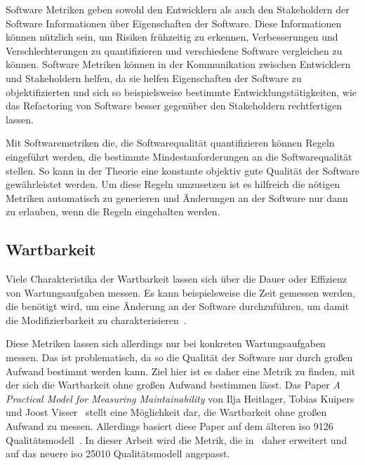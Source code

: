 \documentclass[12pt, a4paper, ngerman]{article}
\begin{document}
Software Metriken geben sowohl den Entwicklern
als auch den Stakeholdern der Software
Informationen über Eigenschaften der Software.
Diese Informationen können nützlich sein,
um Risiken frühzeitig zu erkennen,
Verbesserungen und Verschlechterungen zu quantifizieren
und verschiedene Software vergleichen zu können.
Software Metriken können in der Kommunikation
zwischen Entwicklern und Stakeholdern helfen,
da sie helfen Eigenschaften der Software zu objektifizierten
und sich so beispielsweise bestimmte Entwicklungstätigkeiten,
wie das Refactoring von Software
besser gegenüber den Stakeholdern rechtfertigen lassen.

Mit Softwaremetriken die,
die Softwarequalität quantifizieren
können Regeln eingeführt werden,
die bestimmte Mindestanforderungen an die Softwarequalität stellen.
So kann in der Theorie eine konstante objektiv gute Qualität der Software
gewährleistet werden.
Um diese Regeln umzusetzen ist es hilfreich
die nötigen Metriken automatisch zu generieren
und Änderungen an der Software nur dann zu erlauben,
wenn die Regeln eingehalten werden.


\subsection{Wartbarkeit}

Viele Charakteristika der Wartbarkeit lassen sich über die Dauer oder Effizienz von Wartungsaufgaben messen.
Es kann beispielsweise die Zeit gemessen werden, die benötigt wird,
um eine Änderung an der Software durchzuführen,
um damit die Modifizierbarkeit zu charakterisieren~\cite{maintainability_metrics}.%

Diese Metriken lassen sich allerdings nur bei konkreten Wartungsaufgaben messen.
Das ist problematisch, da so die Qualität der Software nur durch großen Aufwand bestimmt werden kann.
Ziel hier ist es daher eine Metrik zu finden, mit der sich die Wartbarkeit ohne großen Aufwand bestimmen lässt.
Das Paper \emph{A Practical Model for Measuring Maintainability} von Ilja Heitlager, Tobias Kuipers und Joost Visser~\cite{maintainability_metrics}
stellt eine Möglichkeit dar, die Wartbarkeit ohne großen Aufwand zu messen.
Allerdings basiert diese Paper auf dem älteren \ac{iso} 9126 Qualitätsmodell~\cite{maintainability_metrics,ISO9126}.
In dieser Arbeit wird die Metrik, die in~\cite{maintainability_metrics} daher erweitert
und auf das neuere \ac{iso} 25010 Qualitätsmodell angepasst.
\end{document}
